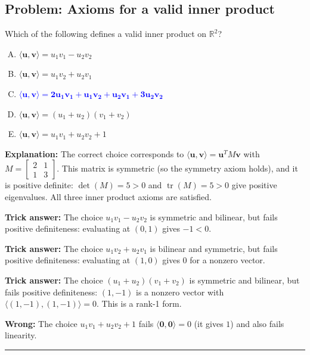 \documentclass[12pt]{amsart}
\newcommand{\divider}{
  \vspace{-1em}
  \noindent
  \raisebox{-0.15ex}{\textbullet}%
  \hspace{0.5em}%
  \rule[0.5ex]{0.95\textwidth}{1.0pt}%
  \hspace{0.5em}%
  \raisebox{-0.15ex}{\textbullet}%
  \vspace{0em}
}
\begin{document}
\subsection*{Problem: Axioms for a valid inner product}

Which of the following defines a valid inner product on $\mathbb{R}^2$?

\begin{enumerate}[(A)]
\item $\langle \mathbf{u}, \mathbf{v} \rangle = u_1 v_1 - u_2 v_2$
\item $\langle \mathbf{u}, \mathbf{v} \rangle = u_1 v_2 + u_2 v_1$
\item \textcolor{blue}{$\boldsymbol{\langle \mathbf{u}, \mathbf{v} \rangle = 2u_1 v_1 + u_1 v_2 + u_2 v_1 + 3u_2 v_2}$}
\item $\langle \mathbf{u}, \mathbf{v} \rangle = (u_1 + u_2)(v_1 + v_2)$
\item $\langle \mathbf{u}, \mathbf{v} \rangle = u_1 v_1 + u_2 v_2 + 1$
\end{enumerate}

\textbf{Explanation:}
The correct choice corresponds to $\langle\mathbf{u},\mathbf{v}\rangle = \mathbf{u}^T M\mathbf{v}$
with $M = \begin{bmatrix}2&1\\1&3\end{bmatrix}$.
This matrix is symmetric (so the symmetry axiom holds), and it is positive
definite: $\det(M) = 5 > 0$ and $\operatorname{tr}(M) = 5 > 0$ give positive
eigenvalues.
All three inner product axioms are satisfied.

\textbf{Trick answer:}
The choice $u_1v_1 - u_2v_2$ is symmetric and bilinear, but fails positive
definiteness: evaluating at $(0,1)$ gives $-1 < 0$.

\textbf{Trick answer:}
The choice $u_1v_2 + u_2v_1$ is bilinear and symmetric, but fails positive
definiteness: evaluating at $(1,0)$ gives $0$ for a nonzero vector.

\textbf{Trick answer:}
The choice $(u_1+u_2)(v_1+v_2)$ is symmetric and bilinear, but fails positive
definiteness: $(1,-1)$ is a nonzero vector with $\langle(1,-1),(1,-1)\rangle = 0$.
This is a rank-1 form.

\textbf{Wrong:}
The choice $u_1v_1 + u_2v_2 + 1$ fails $\langle\mathbf{0},\mathbf{0}\rangle = 0$ (it gives $1$)
and also fails linearity.

\divider
\end{document}
